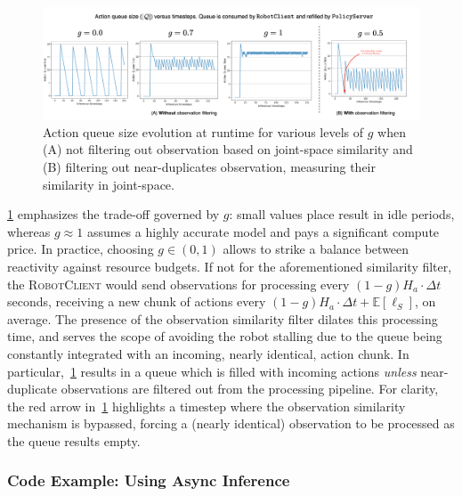 \begin{figure}
    \centering
    \begin{minipage}[t]{0.99\textwidth}
        \centering
        \includegraphics[width=\textwidth]{figures/ch4/ch4-queues.png}
        \caption{Action queue size evolution at runtime for various levels of \( g\) when (A) not filtering out observation based on joint-space similarity and (B) filtering out near-duplicates observation, measuring their similarity in joint-space.}
        \label{fig:ch4-queues}
    \end{minipage}
\end{figure}

\ref{fig:ch4-queues} emphasizes the trade-off governed by \(g\): small values place result in idle periods, whereas \(g\approx 1\) assumes a highly accurate model and pays a significant compute price. In practice, choosing \(g\in(0,1)\) allows to strike a balance between reactivity against resource budgets. 
If not for the aforementioned similarity filter, the \textsc{RobotClient} would send observations for processing every \( (1 - g) H_a \cdot \Delta t\) seconds, receiving a new chunk of actions every \( (1 - g) H_a \cdot \Delta t + \mathbb E[\ell_S] \), on average. 
The presence of the observation similarity filter dilates this processing time, and serves the scope of avoiding the robot stalling due to the queue being constantly integrated with an incoming, nearly identical, action chunk. 
In particular,~\ref{fig:ch4-queues} results in a queue which is filled with incoming actions \emph{unless} near-duplicate observations are filtered out from the processing pipeline. For clarity, the red arrow in~\ref{fig:ch4-queues} highlights a timestep where the observation similarity mechanism is bypassed, forcing a (nearly identical) observation to be processed as the queue results empty.

\subsubsection{Code Example: Using Async Inference}
